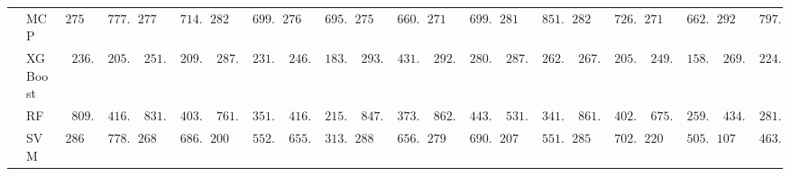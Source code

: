 \begin{tabular}{ll|ll|llllll|llllll|llllll}
 & MCP  & $2752.32$ & $\phantom{0}777.89$ & $2770.50$ & $\phantom{0}714.07$ & $2825.19$ & $\phantom{0}699.88$ & $2768.36$ & $\phantom{0}695.18$ & $2759.76$ & $\phantom{0}660.63$ & $2713.18$ & $\phantom{0}699.23$ & $2813.45$ & $\phantom{0}851.56$ & $2820.90$ & $\phantom{0}726.26$ & $2718.68$ & $\phantom{0}662.70$ & $2927.29$ & $\phantom{0}797.79$ \\
 & XGBoost  & $\phantom{0}236.16$ & $\phantom{0}205.71$ & $\phantom{0}251.33$ & $\phantom{0}209.22$ & $\phantom{0}287.38$ & $\phantom{0}231.34$ & $\phantom{0}246.37$ & $\phantom{0}183.41$ & $\phantom{0}293.97$ & $\phantom{0}431.28$ & $\phantom{0}292.62$ & $\phantom{0}280.49$ & $\phantom{0}287.83$ & $\phantom{0}262.70$ & $\phantom{0}267.14$ & $\phantom{0}205.82$ & $\phantom{0}249.46$ & $\phantom{0}158.45$ & $\phantom{0}269.38$ & $\phantom{0}224.94$ \\
 & RF  & $\phantom{0}809.42$ & $\phantom{0}416.37$ & $\phantom{0}831.30$ & $\phantom{0}403.60$ & $\phantom{0}761.70$ & $\phantom{0}351.66$ & $\phantom{0}416.91$ & $\phantom{0}215.47$ & $\phantom{0}847.79$ & $\phantom{0}373.15$ & $\phantom{0}862.26$ & $\phantom{0}443.68$ & $\phantom{0}531.37$ & $\phantom{0}341.56$ & $\phantom{0}861.58$ & $\phantom{0}402.62$ & $\phantom{0}675.13$ & $\phantom{0}259.25$ & $\phantom{0}434.23$ & $\phantom{0}281.80$ \\
 & SVM  & $2864.89$ & $\phantom{0}778.83$ & $2680.94$ & $\phantom{0}686.57$ & $2006.52$ & $\phantom{0}552.21$ & $\phantom{0}655.75$ & $\phantom{0}313.31$ & $2888.23$ & $\phantom{0}656.91$ & $2796.43$ & $\phantom{0}690.69$ & $2071.19$ & $\phantom{0}551.93$ & $2854.65$ & $\phantom{0}702.23$ & $2204.90$ & $\phantom{0}505.10$ & $1079.35$ & $\phantom{0}463.73$ \\
\hline 
\end{tabular}

